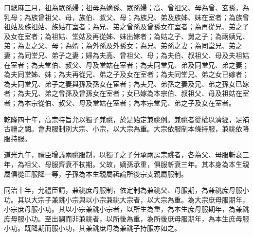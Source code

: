 \begin{pinyinscope}
曰緦麻三月，祖為眾孫婦；祖母為嫡孫、眾孫婦；高、曾祖父、母為曾、玄孫，為乳母；為族曾祖父、母，族伯、叔父、母；為族兄、弟及族姊、妹在室者；為族曾祖姑及族祖姑、族姑在室者；為兄、弟之曾孫及曾孫女在室者；為再從兄、弟之子及女在室者；為祖姑、堂姑及再從姊、妹出嫁者；為姑之子、舅之子；為兩姨兄、弟；為妻之父、母；為婿；為外孫及外孫女；為兄、弟孫之妻；為同堂兄、弟之妻；為同堂兄、弟子之妻；婦為夫高、曾祖父、母；為夫伯、叔祖父、母及夫祖姑在室者；為夫堂伯、叔父、母及堂姑在室者；為夫同堂兄、弟及同堂兄、弟之妻；為夫同堂姊、妹；為夫再從兄、弟之子及女在室者；為夫同堂兄、弟之女已嫁者；為夫同堂兄、弟子之妻與孫及孫女在宦者；為夫兄、弟孫之妻及兄、弟之孫女已嫁者；為夫兄、弟之曾孫及曾孫女在室者；女已嫁為本宗伯、叔祖父、母及祖姑在室者；為本宗從伯、叔父、母及堂姑在室者；為本宗堂兄、弟之子及女在室者。

乾隆四十年，高宗特旨允以獨子兼祧，於是始定兼祧例。兼祧者從權以濟經，足補古禮之闕。會典服制別大宗、小宗，以大宗為重。大宗依服制本條持服，兼祧依降服持服。

道光九年，禮臣增議兩祧服制，以獨子之子分承兩房宗祧者，各為父、母服斬衰三年，為祖父、母服齊衰不杖期。父故，嫡孫承重，俱服斬衰三年。其本身為本生親屬俱從正服降一等，子孫為本生親屬祗論所後宗支親屬服制。

同治十年，允禮臣請，兼祧庶母服制，依定制為兼祧父、母服期，為兼祧庶母服小功。其以大宗子兼祧小宗與以小宗兼祧大宗者，以大宗為重。為大宗庶母服期年，小宗庶母服小功。其以小宗兼祧小宗者，以所生為重，為本生庶母服期年，為兼祧庶母服小功。至出嗣而非兼祧者，以所後為重，為所後庶母服期年，為本生庶母服小功。既降期而服小功，其兼祧庶母為兼祧子持服亦如之。


\end{pinyinscope}